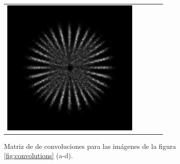 \documentclass{./packages/optica-article}
\begin{document}
\begin{figure}[hbp]
\begin{tabular}[t]{l c c c c}
		\includegraphics[scale=0.25]{Simulation deconvolution/ref_np_0.01/RL_50.png}
		\\
	\end{tabular}
	\caption{Matriz de de convoluciones para las imágenes de la figura \ref{fig:convolutions} (a-d).}
\end{figure}


\end{document}

